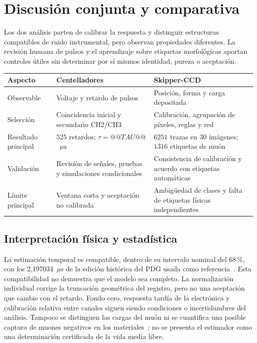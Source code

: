 \documentclass[10pt,a4paper]{article}
\newcommand{\us}{\ensuremath{\mu\mathrm{s}}}
\begin{document}
\section{Discusión conjunta y comparativa}
Los dos análisis parten de calibrar la respuesta y distinguir estructuras compatibles de ruido instrumental, pero observan propiedades diferentes. La revisión humana de pulsos y el aprendizaje sobre etiquetas morfológicas aportan controles útiles sin determinar por sí mismos identidad, pureza o aceptación.
\begin{center}\small
\begin{tabularx}{\textwidth}{@{}lXX@{}}\toprule
Aspecto & Centelladores & Skipper-CCD \\\midrule
Observable & Voltaje y retardo de pulsos & Posición, forma y carga depositada \\
Selección & Coincidencia inicial y secundario CH2/CH3 & Calibración, agrupación de píxeles, reglas y red \\
Resultado principal & $525$ retardos; $\tau=@@TAU@@$~\us & $6251$ trazas en 30 imágenes; $1316$ etiquetas de muón \\
Validación & Revisión de señales, pruebas y simulaciones condicionales & Consistencia de calibración y acuerdo con etiquetas automáticas \\
Límite principal & Ventana corta y aceptación no calibrada & Ambigüedad de clases y falta de etiquetas físicas independientes \\\bottomrule
\end{tabularx}\end{center}

\subsection{Interpretación física y estadística}
La estimación temporal es compatible, dentro de su intervalo nominal del 68\,\%, con los 2{,}197034~\us{} de la edición histórica del PDG usada como referencia~\cite{pdg}. Esta compatibilidad no demuestra que el modelo sea completo. La normalización individual corrige la truncación geométrica del registro, pero no una aceptación que cambie con el retardo. Fondo cero, respuesta tardía de la electrónica y calibración relativa entre canales siguen siendo condiciones o incertidumbres del análisis. Tampoco se distinguen las cargas del muón ni se cuantifica una posible captura de muones negativos en los materiales~\cite{capture}; no se presenta el estimador como una determinación certificada de la vida media libre.
\end{document}
